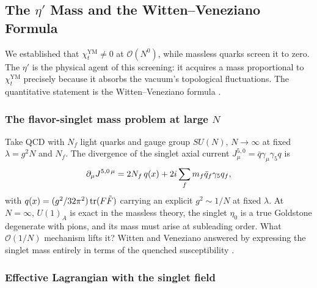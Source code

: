 \subsection{The $\eta'$ Mass and the Witten--Veneziano Formula}
\label{subsec:eta-prime-wv}

We established that $\chi_t^{\mathrm{YM}}\neq 0$ at $\mathcal{O}(N^0)$, while massless quarks screen it to zero.  The $\eta'$ is the physical agent of this screening: it acquires a mass proportional to $\chi_t^{\mathrm{YM}}$ precisely because it absorbs the vacuum's topological fluctuations.  The quantitative statement is the Witten--Veneziano formula \cite{Witten1979U1GoldstoneBoson,Veneziano1979U1WithoutInstantons}.

\subsubsection{The flavor-singlet mass problem at large $N$}

Take QCD with $N_f$ light quarks and gauge group $SU(N)$, $N\to\infty$ at fixed $\lambda = g^2 N$ and $N_f$.  The divergence of the singlet axial current $J_\mu^{5,0} = \bar{q}\gamma_\mu\gamma_5 q$ is
\begin{equation}\label{eq:singlet-axial-divergence}
  \partial_\mu J^{5,0\,\mu} = 2N_f\, q(x) + 2i\sum_f m_f \bar{q}_f\gamma_5 q_f,
\end{equation}
with $q(x) = (g^2/32\pi^2)\operatorname{tr}(F\tilde{F})$ carrying an explicit $g^2\sim 1/N$ at fixed $\lambda$.  At $N=\infty$, $U(1)_A$ is exact in the massless theory, the singlet $\eta_0$ is a true Goldstone degenerate with pions, and its mass must arise at subleading order.  What $\mathcal{O}(1/N)$ mechanism lifts it?  Witten and Veneziano answered by expressing the singlet mass entirely in terms of the quenched susceptibility \cite{Witten1979U1GoldstoneBoson,Veneziano1979U1WithoutInstantons}.

\subsubsection{Effective Lagrangian with the singlet field}

